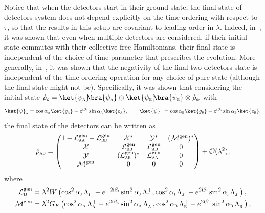 \documentclass[letterpaper,12pt,titlepage,oneside,final]{book}
\newcommand{\ii}{\mathrm{i}}
\newcommand{\tc}[1]{\textsc{#1}}
\begin{document}
Notice that when the detectors start in their ground state, the final state of detectors system does not depend explicitly on the time ordering with respect to $\tau$, so that the results in this setup are covariant to leading order in $\lambda$. Indeed, in~\cite{us2}, it was shown that even when multiple detectors are considered, if their initial state commutes with their collective free Hamiltonians, their final state is independent of the choice of time parameter that prescribes the evolution. More generally, in~\cite{hectorCov}, it was shown that the negativity of the final two detectors state is independent of the time ordering operation for any choice of pure state (although the final state might not be). Specifically, it was shown that considering the initial state $\hat{\rho}_o = \ket{\psi_\tc{a}}\!\!\bra{\psi_\tc{a}}\otimes \ket{\psi_\tc{b}}\!\!\bra{\psi_\tc{b}}\otimes \hat{\rho}_\phi$ with
\begin{equation}
    \ket{\psi}_\tc{a} = \cos \alpha_\tc{a} \ket{g_\tc{a}} - e^{\ii \beta_\tc{a}}\sin\alpha_\tc{a} \ket{e_\tc{a}}, \quad \quad 
    \ket{\psi}_\tc{b} = \cos \alpha_\tc{b} \ket{g_\tc{b}} - e^{\ii \beta_\tc{b}}\sin\alpha_\tc{b} \ket{e_\tc{b}},
\end{equation}
the final state of the detectors can be written as
\begin{equation}
    \hat{\rho}_\tc{ab} =  \begin{pmatrix}
        1 - \mathcal{L}_\tc{aa}^\text{gen} - \mathcal{L}_\tc{bb}^\text{gen} & \mathcal{X}^* & \mathcal{Y}^* & (\mathcal{M}^\text{gen})^*\\
        \mathcal{X} & \mathcal{L}_\tc{bb}^\text{gen} & \mathcal{L}_{\tc{ab}}^\text{gen} & 0\\
        \mathcal{Y} & (\mathcal{L}_\tc{ab}^\text{gen})^* & \mathcal{L}_\tc{aa}^\text{gen} & 0\\
        \mathcal{M}^\text{gen} & 0 & 0 & 0
    \end{pmatrix} + \mathcal{O}(\lambda^2),
\end{equation}
where 
\begin{align}
    \mathcal{L}_{\tc{ij}}^\text{gen} &= \lambda^2 W\left(\cos^2\alpha_\tc{j}\,\Lambda_\tc{i}^- - e^{- 2 \ii \beta_\tc{j}}\sin^2\alpha_\tc{j} \,\Lambda_\tc{i}^+, \cos^2 \alpha_\tc{i} \,\Lambda_\tc{j}^+ - e^{2 \ii \beta_\tc{i}} \sin^2 \alpha_\tc{i} \,\Lambda_\tc{j}^-\right),\\
    \mathcal{M}^\text{gen} &= \lambda^2 G_F\left(\cos^2 \alpha_\tc{a} \,\Lambda_\tc{a}^+ - e^{2 \ii \beta_\tc{a}} \sin^2 \alpha_{\tc{a}} \,\Lambda_\tc{a}^-, \cos^2 \alpha_\tc{b} \,\Lambda_\tc{b}^+ - e^{2 \ii \beta_\tc{b}}\sin^2 \alpha_\tc{b}\,\Lambda_\tc{b}^-\right),
\end{align}
\end{document}
